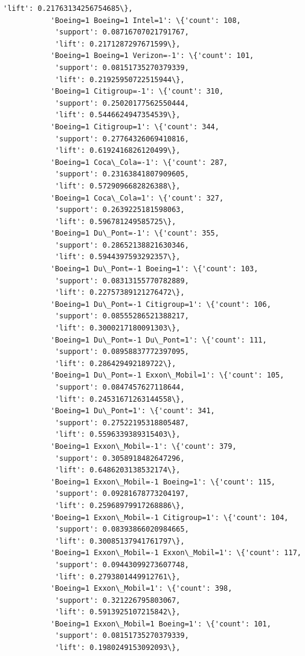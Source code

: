 \documentclass[11pt]{article}
\begin{document}
\begin{Verbatim}[commandchars=\\\{\}]
            'lift': 0.21763134256754685\},
           'Boeing=1 Boeing=1 Intel=1': \{'count': 108,
            'support': 0.08716707021791767,
            'lift': 0.2171287297671599\},
           'Boeing=1 Boeing=1 Verizon=-1': \{'count': 101,
            'support': 0.08151735270379339,
            'lift': 0.21925950722515944\},
           'Boeing=1 Citigroup=-1': \{'count': 310,
            'support': 0.25020177562550444,
            'lift': 0.5446624947354539\},
           'Boeing=1 Citigroup=1': \{'count': 344,
            'support': 0.27764326069410816,
            'lift': 0.6192416826120499\},
           'Boeing=1 Coca\_Cola=-1': \{'count': 287,
            'support': 0.23163841807909605,
            'lift': 0.5729096682826388\},
           'Boeing=1 Coca\_Cola=1': \{'count': 327,
            'support': 0.2639225181598063,
            'lift': 0.596781249585725\},
           'Boeing=1 Du\_Pont=-1': \{'count': 355,
            'support': 0.28652138821630346,
            'lift': 0.5944397593292357\},
           'Boeing=1 Du\_Pont=-1 Boeing=1': \{'count': 103,
            'support': 0.08313155770782889,
            'lift': 0.22757389121276472\},
           'Boeing=1 Du\_Pont=-1 Citigroup=1': \{'count': 106,
            'support': 0.08555286521388217,
            'lift': 0.3000217180091303\},
           'Boeing=1 Du\_Pont=-1 Du\_Pont=1': \{'count': 111,
            'support': 0.08958837772397095,
            'lift': 0.286429492189722\},
           'Boeing=1 Du\_Pont=-1 Exxon\_Mobil=1': \{'count': 105,
            'support': 0.0847457627118644,
            'lift': 0.24531671263144558\},
           'Boeing=1 Du\_Pont=1': \{'count': 341,
            'support': 0.27522195318805487,
            'lift': 0.5596339389315403\},
           'Boeing=1 Exxon\_Mobil=-1': \{'count': 379,
            'support': 0.3058918482647296,
            'lift': 0.6486203138532174\},
           'Boeing=1 Exxon\_Mobil=-1 Boeing=1': \{'count': 115,
            'support': 0.09281678773204197,
            'lift': 0.25968979917268886\},
           'Boeing=1 Exxon\_Mobil=-1 Citigroup=1': \{'count': 104,
            'support': 0.08393866020984665,
            'lift': 0.30085137941761797\},
           'Boeing=1 Exxon\_Mobil=-1 Exxon\_Mobil=1': \{'count': 117,
            'support': 0.09443099273607748,
            'lift': 0.2793801449912761\},
           'Boeing=1 Exxon\_Mobil=1': \{'count': 398,
            'support': 0.321226795803067,
            'lift': 0.5913925107215842\},
           'Boeing=1 Exxon\_Mobil=1 Boeing=1': \{'count': 101,
            'support': 0.08151735270379339,
            'lift': 0.1980249153092093\},

\end{Verbatim}
\end{document}

